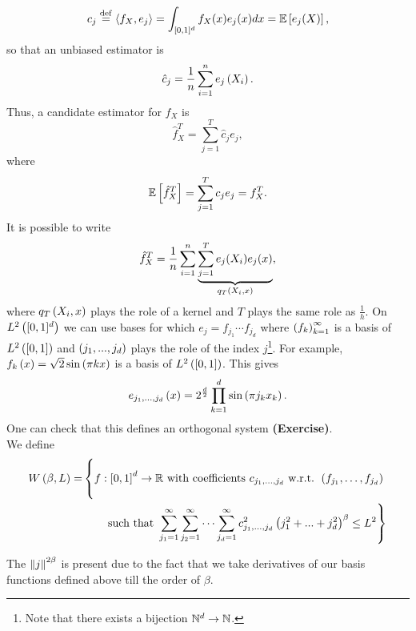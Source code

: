 \begin{equation*}
c_j \overset{\mathrm{def}}{=} \left\langle f_X,e_j\right\rangle=\int_{[0,1]^d}f_X(x)e_j(x)dx = \mathbb{E}\left[e_j(X)\right],
\end{equation*}
so that an unbiased estimator is
\begin{equation*}
\hat{c}_j = \frac{1}{n}\sum_{i=1}^n e_j\left(X_i\right).
\end{equation*}
Thus, a candidate estimator for $f_X$ is
\begin{equation*}
  \hat{f}_X^T = \sum_{j=1}^T \hat{c}_j e_j,
\end{equation*} where
\begin{equation*}
\mathbb{E}\left[\hat{f}_X^T\right]=\sum_{j=1}^T c_j e_j = f_X^T.
\end{equation*}
It is possible to write
\begin{equation*}
  \hat{f}_X^T=\frac{1}{n} \sum_{i=1}^n \underbrace{\sum_{j=1}^T e_j(X_i)e_j(x)}_{q_T\left(X_i,x\right)},
\end{equation*}
where $q_T\left(X_i,x\right)$ plays the role of a kernel and $T$ plays the same role as $\frac{1}{h}$.
On $L^2\left([0,1]^d\right)$ we can use bases for which $e_j=f_{j_1}\cdots f_{j_d}$ where $\left(f_k\right)_{k=1}^\infty$ is a basis of $L^2\left([0,1]\right)$ and $\left(j_1,...,j_d\right)$ plays the role of the index $j$\footnote{Note that there exists a bijection $\mathbb{N}^d\rightarrow \mathbb{N}$.}.
For example, $f_{k}\left(x\right) = \sqrt{2}\sin\left(\pi k x\right)$ is a basis of $L^2\left([0,1]\right)$.
This gives
\begin{equation*}
  e_{j_1,\ldots,j_d} \left(x\right) = 2^{\frac{d}{2}} \prod_{k=1}^d \sin\left(\pi j_k x_k\right).
\end{equation*}
One can check that this defines an orthogonal system \textbf{(Exercise)}.
\\ We define
\begin{equation*}
\begin{split}
W\pa{\beta, L} = &\left\{ \vphantom{\sum_{j_d=1}^\infty}f: \bra{0,1}^d\rightarrow \R \text{ with coefficients } c_{{j_1},\ldots,{j_d}}\text{ w.r.t. } \pa{f_{j_1}, \ldots, f_{j_d}} \right.  \\
&\quad\quad \left. \text{such that } \sum_{j_1=1}^\infty \sum_{j_2=1}^\infty\cdots \sum_{j_d=1}^\infty c_{j_1,...,j_d}^2\pa{j_1^2+...+j_d^2}^\beta\leq L^2 \right\}
\end{split}
\end{equation*}

\begin{remark}
  The $\left\| j \right\|^{2\beta}$ is present due to the fact that we take derivatives of our basis functions defined above till the order of $\beta$.
\end{remark}

